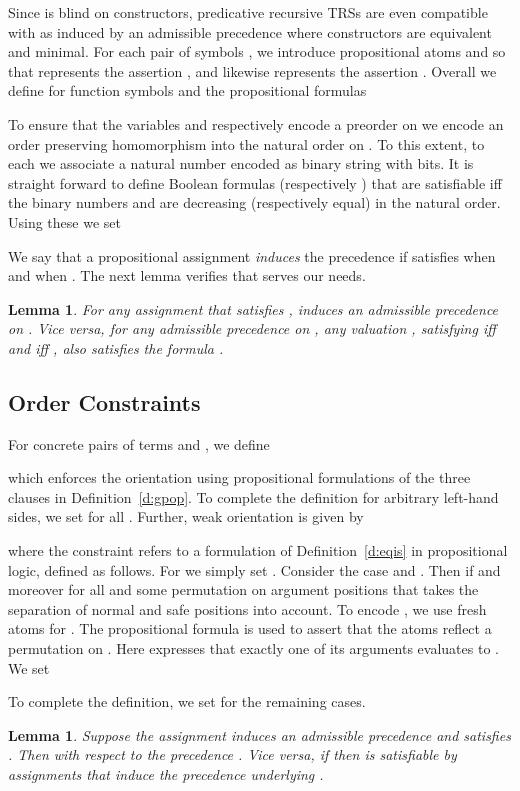 \documentclass{LMCS}
\newtheorem{lemma}[thm]{Lemma}
\begin{document}
Since  is blind on constructors, predicative 
recursive TRSs are even compatible with  
as induced by an admissible precedence where constructors are equivalent and minimal.
For each pair of symbols , we introduce
propositional atoms  and  so that 
represents the assertion , and likewise 
 represents the assertion .
Overall we define for function symbols  and  the propositional formulas


To ensure that the variables  and respectively  encode a preorder on  
we encode an order preserving homomorphism into the natural order  on . 
To this extent, to each  we associate a natural number  encoded as binary string
with  bits. 
It is straight forward to define Boolean formulas  (respectively ) that are satisfiable iff 
the binary numbers  and  are decreasing (respectively equal) in the natural order. Using these we set


We say that a propositional assignment  \emph{induces} the precedence
 if  satisfies  when  and  when . 
The next lemma verifies that  serves our needs.
\begin{lemma}
  For any assignment  that satisfies , 
   induces an admissible precedence on .
Vice versa, for any admissible precedence  on , 
  any valuation , satisfying  iff  and 
   iff , also satisfies
  the formula .
\end{lemma}

\subsection{Order Constraints}
For concrete pairs of terms  and , we define

which enforces the orientation  using propositional formulations 
of the three clauses in Definition~\ref{d:gpop}. 
To complete the definition for arbitrary left-hand sides, we set  for all .
Further, weak orientation is given by

where the constraint  refers to a formulation of 
Definition~\ref{d:eqis} in propositional logic, defined as follows.
For  we simply set . 
Consider the case  and . 
Then  if  
and moreover  for all  and 
some permutation  on argument positions that takes the separation of normal and safe positions into account.
To encode , we use fresh atoms  for . 
The propositional formula 
is used to assert that the atoms  reflect a permutation on . 
Here  expresses that exactly one of its arguments evaluates to .
We set

To complete the definition, we set  for 
the remaining cases.
\begin{lemma}
  Suppose the assignment  induces an admissible precedence  and 
   satisfies . 
  Then  with respect to the precedence .
  Vice versa, if  then  is satisfiable by assignments  
  that induce the precedence underlying .
\end{lemma}
\end{document}
